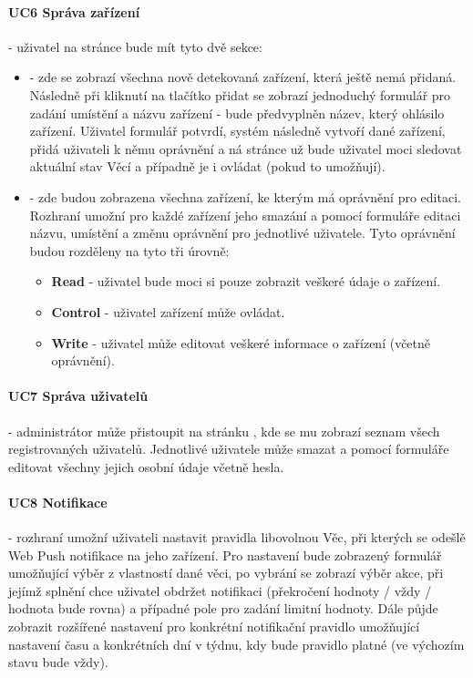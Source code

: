 \paragraph{UC6 Správa zařízení}
- uživatel na stránce  bude mít tyto dvě sekce:
\begin{itemize}
    \item {} - zde se zobrazí všechna nově detekovaná zařízení, která ještě nemá přidaná. Následně při kliknutí na tlačítko přidat se zobrazí jednoduchý formulář pro zadání umístění a názvu zařízení - bude předvyplněn název, který ohlásilo zařízení. Uživatel formulář potvrdí, systém následně vytvoří dané zařízení, přidá uživateli k němu oprávnění a ná stránce  už bude uživatel moci sledovat aktuální stav Věcí a případně je i ovládat (pokud to umožňují).
    \item  {} - zde budou zobrazena všechna zařízení, ke kterým má oprávnění pro editaci. Rozhraní umožní pro každé zařízení jeho smazání a pomocí formuláře editaci názvu, umístění a změnu oprávnění pro jednotlivé uživatele. Tyto oprávnění budou rozděleny na tyto tři úrovně:
          \begin{itemize}
              \item \textbf{Read} - uživatel bude moci si pouze zobrazit veškeré údaje o zařízení.
              \item \textbf{Control} - uživatel zařízení může ovládat.
              \item \textbf{Write} - uživatel může editovat veškeré informace o zařízení (včetně oprávnění).
          \end{itemize}
\end{itemize}

\paragraph{UC7 Správa uživatelů}
- administrátor může přistoupit na stránku , kde se mu zobrazí seznam všech registrovaných uživatelů. Jednotlivé uživatele může smazat a pomocí formuláře editovat všechny jejich osobní údaje včetně hesla.

\paragraph{UC8 Notifikace}
- rozhraní umožní uživateli nastavit pravidla libovolnou Věc, při kterých se odešlě Web Push notifikace na jeho zařízení. Pro nastavení bude zobrazený formulář umožňující výběr z vlastností dané věci, po vybrání se zobrazí výběr akce, při jejímž splnění chce uživatel obdržet notifikaci (překročení hodnoty / vždy / hodnota bude rovna) a případné pole pro zadání limitní hodnoty. Dále půjde zobrazit rozšířené nastavení pro konkrétní notifikační pravidlo umožňující nastavení času a konkrétních dní v týdnu, kdy bude pravidlo platné (ve výchozím stavu bude vždy).



